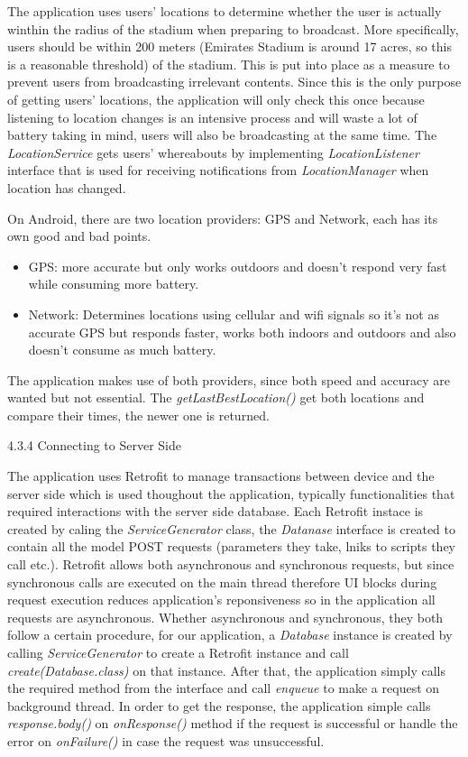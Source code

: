 \documentclass{article}
\begin{document}
\begin{flushleft}
The application uses users' locations to determine whether the user is actually winthin the radius of the stadium when preparing to broadcast. More specifically, users should be within 200 meters (Emirates Stadium is around 17 acres, so this is a reasonable threshold) of the stadium. This is put into place as a measure to prevent users from broadcasting irrelevant contents. Since this is the only purpose of getting users' locations, the application will only check this once because listening to location changes is an intensive process and will waste a lot of battery taking in mind, users will also be broadcasting at the same time. The \textit{LocationService} gets users' whereabouts by implementing \textit{LocationListener} interface that is used for receiving notifications from \textit{LocationManager} when location has changed.\par
On Android, there are two location providers: GPS and Network, each has its own good and bad points.\par
\begin{itemize}
	\item GPS: more accurate but only works outdoors and doesn't respond very fast while consuming more battery.
	\item Network: Determines locations using cellular and wifi signals so it's not as accurate GPS but responds faster, works both indoors and outdoors and also doesn't consume as much battery.
\end{itemize}
The application makes use of both providers, since both speed and accuracy are wanted but not essential. The \textit{getLastBestLocation()} get both locations and compare their times, the newer one is returned.\par
{\large 4.3.4 Connecting to Server Side}\par
The application uses Retrofit to manage transactions between device and the server side which is used thoughout the application, typically functionalities that required interactions with the server side database. Each Retrofit instace is created by caling the \textit{ServiceGenerator} class, the \textit{Datanase} interface is created to contain all the model POST requests (parameters they take, lniks to scripts they call etc.). Retrofit allows both asynchronous and synchronous requests, but since synchronous calls are executed on the main thread therefore UI blocks during request execution reduces application's reponsiveness so in the application all requests are asynchronous. Whether asynchronous and synchronous, they both follow a certain procedure, for our application, a \textit{Database} instance is created by calling \textit{ServiceGenerator} to create a Retrofit instance and call \textit{create(Database.class)} on that instance. After that, the application simply calls the required method from the interface and call \textit{enqueue} to make a request on background thread. In order to get the response, the application simple calls \textit{response.body()} on \textit{onResponse()} method if the request is successful or handle the error on \textit{onFailure()} in case the request was unsuccessful.\par

\end{flushleft}
\end{document}
